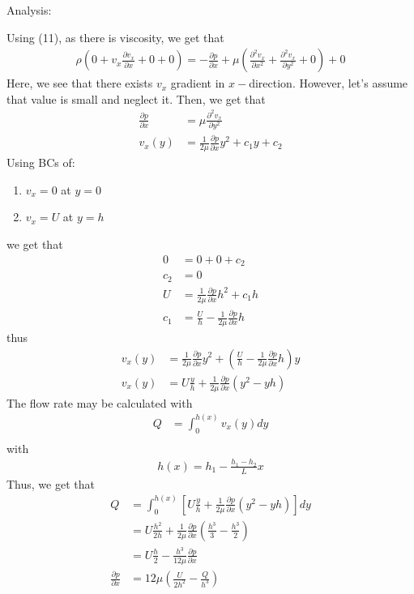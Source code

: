\documentclass[10pt]{article}
\begin{document}
\hfill

Analysis:

Using (11), as there is viscosity, we get that
\begin{align*}
    \rho \left( 0 + v_x \frac{\partial v_x}{\partial x} + 0 + 0 \right) = -\frac{\partial p}{\partial x} + \mu \left(\frac{\partial^2 v_x}{\partial x^2} + \frac{\partial^2 v_x}{\partial y^2} + 0 \right) + 0
\end{align*}
Here, we see that there exists $v_x$ gradient in $x-$direction. However, let's assume that value is small and neglect it. Then, we get that
\begin{align*}
    \frac{\partial p}{\partial x} &= \mu \frac{\partial^2 v_x}{\partial y^2} \\
    v_x (y) &= \frac{1}{2\mu}\frac{\partial p}{\partial x} y^2 + c_1 y + c_2
\end{align*}
Using BCs of:
\begin{enumerate}
    \item $v_x = 0$ at $y = 0$
    \item $v_x = U$ at $y = h$
\end{enumerate}
we get that
\begin{align*}
    0 &= 0 + 0 + c_2 \\
    c_2 &= 0 \\
    U &= \frac{1}{2\mu}\frac{\partial p}{\partial x} h^2 + c_1 h \\
    c_1 &= \frac{U}{h} - \frac{1}{2\mu}\frac{\partial p}{\partial x} h
\end{align*}
thus
\begin{align*}
    v_x (y) &= \frac{1}{2\mu}\frac{\partial p}{\partial x} y^2 + \left(\frac{U}{h} - \frac{1}{2\mu}\frac{\partial p}{\partial x} h\right) y \\
    v_x (y) &= U\frac{y}{h} + \frac{1}{2\mu}\frac{\partial p}{\partial x}\left(y^2 - yh\right)
\end{align*}
The flow rate may be calculated with 
\begin{align*}
    Q &= \int_0^{h(x)} v_x(y) dy \\
\end{align*}
with
\begin{align*}
    h(x) = h_1 - \frac{h_1 - h_2}{L}x
\end{align*}
Thus, we get that
\begin{align*}
    Q &= \int_0^{h(x)} \left[U\frac{y}{h} + \frac{1}{2\mu}\frac{\partial p}{\partial x}\left(y^2 - yh\right)\right] dy \\
    &= U\frac{h^2}{2h} + \frac{1}{2\mu}\frac{\partial p}{\partial x}\left(\frac{h^3}{3} - \frac{h^3}{2}\right) \\
    &= U\frac{h}{2} - \frac{h^3}{12\mu}\frac{\partial p}{\partial x} \\
    \frac{\partial p}{\partial x} &= 12\mu \left(\frac{U}{2h^2} - \frac{Q}{h^3}\right)
\end{align*}
\end{document}
